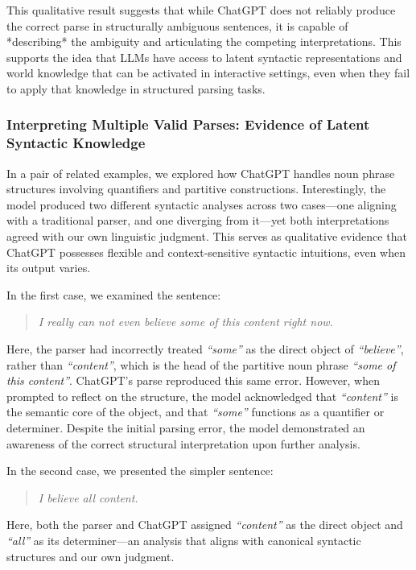 This qualitative result suggests that while ChatGPT does not reliably produce the correct parse in structurally ambiguous sentences, it is capable of *describing* the ambiguity and articulating the competing interpretations. This supports the idea that LLMs have access to latent syntactic representations and world knowledge that can be activated in interactive settings, even when they fail to apply that knowledge in structured parsing tasks.

\subsubsection{Interpreting Multiple Valid Parses: Evidence of Latent Syntactic Knowledge}

In a pair of related examples, we explored how ChatGPT handles noun phrase structures involving quantifiers and partitive constructions. Interestingly, the model produced two different syntactic analyses across two cases—one aligning with a traditional parser, and one diverging from it—yet both interpretations agreed with our own linguistic judgment. This serves as qualitative evidence that ChatGPT possesses flexible and context-sensitive syntactic intuitions, even when its output varies.

In the first case, we examined the sentence:

\begin{quote}
    \textit{I really can not even believe some of this content right now.}
\end{quote}

Here, the parser had incorrectly treated \textit{“some”} as the direct object of \textit{“believe”}, rather than \textit{“content”}, which is the head of the partitive noun phrase \textit{“some of this content”}. ChatGPT's parse reproduced this same error. However, when prompted to reflect on the structure, the model acknowledged that \textit{“content”} is the semantic core of the object, and that \textit{“some”} functions as a quantifier or determiner. Despite the initial parsing error, the model demonstrated an awareness of the correct structural interpretation upon further analysis.

In the second case, we presented the simpler sentence:

\begin{quote}
    \textit{I believe all content.}
\end{quote}

Here, both the parser and ChatGPT assigned \textit{“content”} as the direct object and \textit{“all”} as its determiner—an analysis that aligns with canonical syntactic structures and our own judgment.

